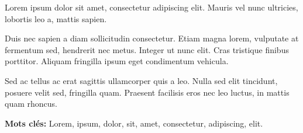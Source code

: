 
Lorem ipsum dolor sit amet, consectetur adipiscing elit.
Mauris vel nunc ultricies, lobortis leo a, mattis sapien.

Duis nec sapien a diam sollicitudin consectetur.
Etiam magna lorem, vulputate at fermentum sed, hendrerit nec metus.
Integer ut nunc elit.
Cras tristique finibus porttitor.
Aliquam fringilla ipsum eget condimentum vehicula.

Sed ac tellus ac erat sagittis ullamcorper quis a leo.
Nulla sed elit tincidunt, posuere velit sed, fringilla quam.
Praesent facilisis eros nec leo luctus, in mattis quam rhoncus.

\begin{singlespace}
    \textbf{Mots clés:} Lorem, ipsum, dolor, sit, amet, consectetur, adipiscing, elit.
\end{singlespace}